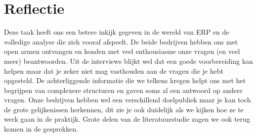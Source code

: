 
\chapter{Reflectie}
\label{ch:reflectie}

Deze taak heeft ons een betere inkijk gegeven in de wereld van ERP en de volledige analyse die zich vooraf afspeelt. De beide bedrijven hebben ons met open armen ontvangen en konden met veel enthousiasme onze vragen (en veel meer) beantwoorden. Uit de interviews blijkt wel dat een goede voorbereiding kan helpen maar dat je zeker niet mag vasthouden aan de vragen die je hebt opgesteld. De achterliggende informatie die we telkens kregen helpt ons met het begrijpen van complexere structuren en gaven soms al een antwoord op andere vragen. Onze bedrijven hebben wel een verschillend doelpubliek maar je kan toch de grote gelijkenissen herkennen, dit zie je ook duidelijk als we kijken hoe ze te werk gaan in de praktijk. Grote delen van de literatuurstudie zagen we ook terug komen in de gesprekken.

